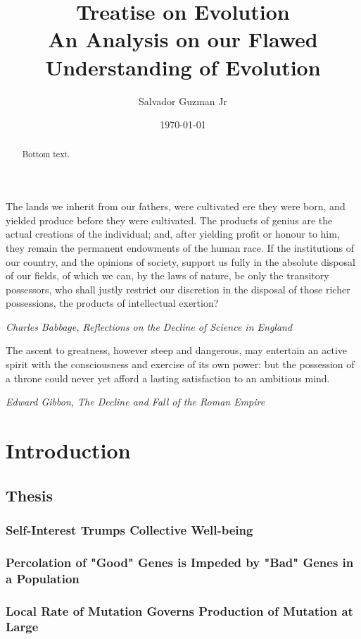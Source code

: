 \documentclass[UTF8]{article}
\title{%
	Treatise on Evolution \\
	\large An Analysis on our Flawed Understanding of Evolution
}
\author{Salvador Guzman Jr}
\date{\today}
\begin{document}
	\maketitle
	\newpage

	\begin{abstract}
		Bottom text.
	\end{abstract}

	\newpage

	\begin{center}
		\epigraph{
			The lands we inherit from our fathers, were cultivated ere they were born, and yielded produce before they were cultivated. The products of genius are the actual creations of the individual; and, after yielding profit or honour to him, they remain the permanent endowments of the human race. If the institutions of our country, and the opinions of society, support us fully in the absolute disposal of our fields, of which we can, by the laws of nature, be only the transitory possessors, who shall justly restrict our discretion in the disposal of those richer possessions, the products of intellectual exertion?
		}{\textit{Charles Babbage, Reflections on the Decline of Science in England}}
		\epigraph{
			The ascent to greatness, however steep and dangerous, may entertain an active spirit with the consciousness and exercise of its own power: but the possession of a throne could never yet afford a lasting satisfaction to an ambitious mind.
		}{\textit{Edward Gibbon, The Decline and Fall of the Roman Empire}}
	\end{center}

	\newpage
	\tableofcontents
	\newpage
	
	\section{Introduction}
	\subsection{Thesis}
	\subsubsection{Self-Interest Trumps Collective Well-being}
	\subsubsection{Percolation of "Good" Genes is Impeded by "Bad" Genes in a Population}
	\subsubsection{Local Rate of Mutation Governs Production of Mutation at Large}
\end{document}

